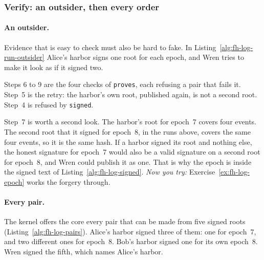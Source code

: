 
\subsubsection{Verify: an outsider, then every order}

\paragraph{An outsider.}
Evidence that is easy to check must also be hard to fake. In
Listing~\ref{alg:fh-log-run-outsider} Alice's harbor signs one root for
each epoch, and Wren tries to make it look as if it signed two.


Steps 6 to 9 are the four checks of \texttt{proves}, each refusing a pair
that fails it. Step~5 is the retry: the harbor's own root, published
again, is not a second root. Step~4 is refused by \texttt{signed}.

Step~7 is worth a second look. The harbor's root for epoch~7 covers four
events. The second root that it signed for epoch~8, in the runs above,
covers the same four events, so it is the same hash. If a harbor signed
its root and nothing else, the honest signature for epoch~7 would also be
a valid signature on a second root for epoch~8, and Wren could publish it
as one. That is why the epoch is inside the signed text of
Listing~\ref{alg:fh-log-signed}. \emph{Now you try:}
Exercise~\ref{ex:fh-log-epoch} works the forgery through.

\paragraph{Every pair.}
The kernel offers the core every pair that can be made from five signed
roots (Listing~\ref{alg:fh-log-pairs}). Alice's harbor signed three of
them: one for epoch~7, and two different ones for epoch~8. Bob's harbor
signed one for its own epoch~8. Wren signed the fifth, which names Alice's
harbor.

